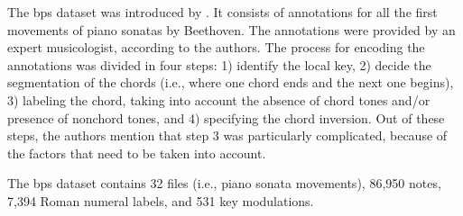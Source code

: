

The \gls{bps} dataset was introduced by
\textcite{chen2018functional}. It consists of annotations
for all the first movements of piano sonatas by Beethoven.
The annotations were provided by an expert musicologist,
according to the authors. The process for encoding the
annotations was divided in four steps: 1) identify the local
key, 2) decide the segmentation of the chords (i.e., where
one chord ends and the next one begins), 3) labeling the
chord, taking into account the absence of chord tones
and/or presence of nonchord tones, and 4)
specifying the chord inversion. Out of these steps, the
authors mention that step 3 was particularly complicated,
because of the factors that need to be taken into account. 

The \gls{bps} dataset contains 32 files (i.e., piano sonata
movements), 86,950 notes, 7,394 Roman numeral labels, and
531 key modulations.